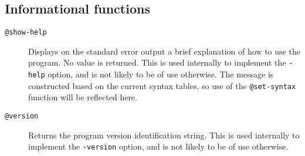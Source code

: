 \subsection{Informational functions}
\begin{description}
\item[{\tt @show-help\ttlb\ttrb}]
Displays on the standard error output a brief explanation of how to use
the program.  No value is returned.
This is used internally to implement the
\verb/-help/ option, and is not likely to be of use otherwise.
The message is constructed based on the current syntax
tables, so use of the \verb/@set-syntax/ function will be reflected here.

\item[{\tt @version\ttlb\ttrb}]
Returns the program version identification string.
This is used internally to implement the \verb/-version/ option, and is
not likely to be of use otherwise.
\end{description}



